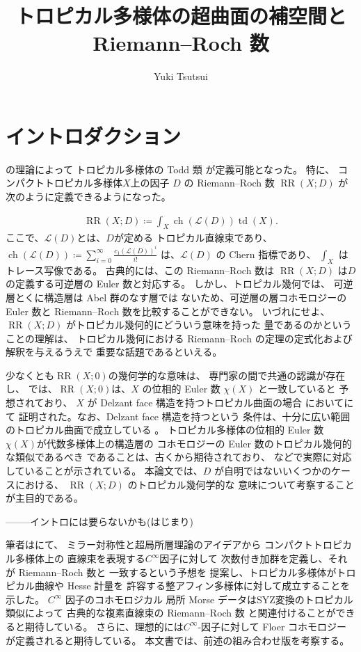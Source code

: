 \documentclass[a4paper,dvipdfmx,reqno,12pt]{amsart}
\title{トロピカル多様体の超曲面の補空間と Riemann--Roch 数}
\author[Y. Tsutsui]{Yuki Tsutsui}
\theoremstyle{definition}
\newcommand{\deq}{\coloneqq}
\newcommand{\opn}[1]{\operatorname{#1}}
\numberwithin{equation}{section}
\begin{document}
\maketitle

\section{イントロダクション}

\cite{demedrano2023chern}の理論によって
トロピカル多様体の Todd 類 が定義可能となった。
特に、
コンパクトトロピカル多様体$X$上の因子
$D$ の
Riemann--Roch 数 $\opn{RR}(X;D)$ が
次のように定義できるようになった。

\begin{align}
     \opn{RR}(X;D)\deq \int_{X}\opn{ch}(\mathcal{L}(D))\opn{td}(X).
\end{align}
ここで、$\mathcal{L}(D)$とは、$D$が定める
トロピカル直線束であり、
$\opn{ch}(\mathcal{L}(D))\deq 
\sum_{i=0}^{\infty}\frac{c_1(\mathcal{L}(D))^{i}}{i!}$
は、$\mathcal{L}(D)$ の Chern 指標であり、
$\int_X$ はトレース写像である。
古典的には、この Riemann--Roch 数は $\opn{RR}(X;D)$
は$D$の定義する可逆層の Euler 数と対応する。
しかし、トロピカル幾何では、
可逆層とくに構造層は Abel 群のなす層では
ないため、可逆層の層コホモロジーの Euler 数と
Riemann--Roch 数を比較することができない。
いづれにせよ、
$\opn{RR}(X;D)$ がトロピカル幾何的にどういう意味を持った
量であるのかということの理解は、
トロピカル幾何における
Riemann--Roch の定理の定式化および解釈を与えるうえで
重要な話題であるといえる。

少なくとも$\opn{RR}(X;0)$の幾何学的な意味は、
専門家の間で共通の認識が存在し、
\cite[Conjecture 6.13]{demedrano2023chern}
では、$\opn{RR}(X;0)$は、$X$
の位相的 Euler 数 $\chi(X)$ と一致していると
予想されており、
$X$ が Delzant face 構造を持つトロピカル曲面の場合
において\cite[Theorem 6.3]{demedrano2023chern}にて
証明された。なお、Delzant face 構造を持つという
条件は、十分に広い範囲のトロピカル曲面で成立している
\cite[Corollary 6.11]{demedrano2023chern}。
トロピカル多様体の位相的 Euler 数
$\chi(X)$が代数多様体上の構造層の
コホモロジーの Euler 数のトロピカル幾何的な類似であるべき
であることは、古くから期待されており、
\cite[Corollary 2]{MR3961331}
などで実際に対応していることが示されている。
本論文では、$D$ が自明ではないいくつかのケースにおける、
$\opn{RR}(X;D)$ のトロピカル幾何学的な
意味について考察することが主目的である。

--------イントロには要らないかも(はじまり)

筆者は\cite{tsutsui2023graded}にて、
ミラー対称性と超局所層理論のアイデアから
コンパクトトロピカル多様体上の
直線束を表現する$C^{\infty}$因子に対して
次数付き加群を定義し、それが Riemann--Roch 数と
一致するという予想\cite[Conjecture 1.2]{tsutsui2023graded}を
提案し、トロピカル多様体がトロピカル曲線や Hesse 計量を
許容する整アフィン多様体に対して成立することを示した。
$C^{\infty}$ 因子のコホモロジカル
局所 Morse データはSYZ変換のトロピカル類似によって
古典的な複素直線束の Riemann--Roch 数
と関連付けることができると期待している。
さらに、理想的には$C^{\infty}$-因子に対して
Floer コホモロジーが定義されると期待している。
本文書では、前述の組み合わせ版を考察する。
\end{document}
